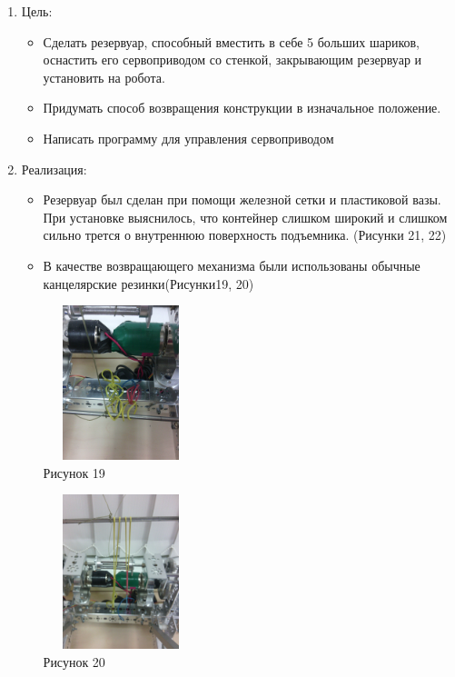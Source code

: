 ﻿\begin{enumerate}
	\item Цель:
		\begin{itemize}
			\item Сделать резервуар, способный вместить в себе 5 больших шариков, оснастить его сервоприводом со стенкой, закрывающим резервуар и установить на робота.
			\item Придумать способ возвращения конструкции в изначальное положение.
			\item Написать программу для управления сервоприводом 
		\end{itemize}
	\item Реализация:
		\begin{itemize}
			\item Резервуар был сделан при помощи железной сетки и пластиковой вазы. При установке выяснилось, что контейнер слишком широкий и слишком сильно трется о внутреннюю поверхность подъемника. (Рисунки 21, 22)
			\item В качестве возвращающего механизма были использованы обычные канцелярские резинки(Рисунки19, 20)\\
			\begin{minipage}{0.3\linewidth}
			\includegraphics[width=45mm,height=45mm]{Days/15.11.14/12_1_robot}\\ Рисунок 19
			\end{minipage}
			\begin{minipage}{0.3\linewidth}
			\includegraphics[width=45mm,height=45mm]{Days/15.11.14/12_2_robot}\\ Рисунок 20
			\end{minipage}\\

\end{itemize}
\end{enumerate}
